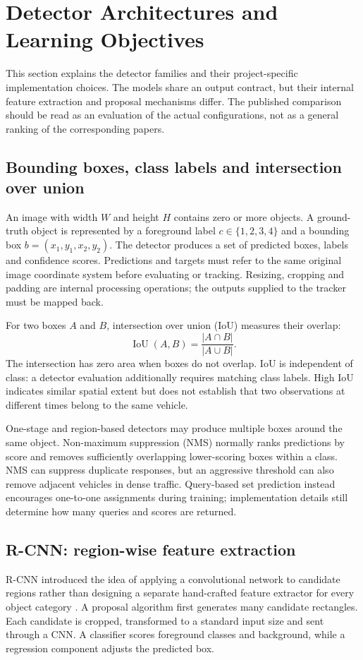 \section{Detector Architectures and Learning Objectives}
\label{sec:detector-details}
This section explains the detector families and their project-specific implementation choices. The models share an output contract, but their internal feature extraction and proposal mechanisms differ. The published comparison should be read as an evaluation of the actual configurations, not as a general ranking of the corresponding papers.

\subsection{Bounding boxes, class labels and intersection over union}
An image with width $W$ and height $H$ contains zero or more objects. A ground-truth object is represented by a foreground label $c\in\{1,2,3,4\}$ and a bounding box $b=(x_1,y_1,x_2,y_2)$. The detector produces a set of predicted boxes, labels and confidence scores. Predictions and targets must refer to the same original image coordinate system before evaluating or tracking. Resizing, cropping and padding are internal processing operations; the outputs supplied to the tracker must be mapped back.

For two boxes $A$ and $B$, intersection over union (IoU) measures their overlap:
\begin{equation}
\operatorname{IoU}(A,B)=\frac{|A\cap B|}{|A\cup B|}.
\end{equation}
The intersection has zero area when boxes do not overlap. IoU is independent of class: a detector evaluation additionally requires matching class labels. High IoU indicates similar spatial extent but does not establish that two observations at different times belong to the same vehicle.

One-stage and region-based detectors may produce multiple boxes around the same object. Non-maximum suppression (NMS) normally ranks predictions by score and removes sufficiently overlapping lower-scoring boxes within a class. NMS can suppress duplicate responses, but an aggressive threshold can also remove adjacent vehicles in dense traffic. Query-based set prediction instead encourages one-to-one assignments during training; implementation details still determine how many queries and scores are returned.

\subsection{R-CNN: region-wise feature extraction}
R-CNN introduced the idea of applying a convolutional network to candidate regions rather than designing a separate hand-crafted feature extractor for every object category \cite{rcnn}. A proposal algorithm first generates many candidate rectangles. Each candidate is cropped, transformed to a standard input size and sent through a CNN. A classifier scores foreground classes and background, while a regression component adjusts the predicted box.


